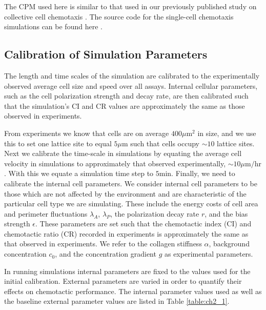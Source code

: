The CPM used here is similar to that used in our previously published study on collective cell chemotaxis \cite{varennes2016collective}. The source code for the single-cell chemotaxis simulations can be found here \cite{ch2code}.

\subsection{Calibration of Simulation Parameters}

The length and time scales of the simulation are calibrated to the experimentally observed average cell size and speed over all assays. Internal cellular parameters, such as the cell polarization strength and decay rate, are then calibrated such that the simulation's CI and CR values are approximately the same as those observed in experiments.

From experiments we know that cells are on average $400 \mu\text{m}^2$ in size, and we use this to set one lattice site to equal $5 \mu\text{m}$ such that cells occupy $\sim 10$ lattice sites. Next we calibrate the time-scale in simulations by equating the average cell velocity in simulations to approximately that observed experimentally, $\sim 10 \mu\text{m/hr}$. With this we equate a simulation time step to $5 \text{min}$. Finally, we need to calibrate the internal cell parameters. We consider internal cell parameters to be those which are not affected by the environment and are characteristic of the particular cell type we are simulating.
These include the energy costs of cell area and perimeter fluctuations $\lambda_A$, $\lambda_P$, the polarization decay rate $r$, and the bias strength $\epsilon$. These parameters are set such that the chemotactic index (CI) and chemotactic ratio (CR) recorded in experiments is approximately the same as that observed in experiments. We refer to the collagen stiffness $\alpha$, background concentration $c_0$, and the concentration gradient $g$ as experimental parameters.

In running simulations internal parameters are fixed to the values used for the initial calibration. External parameters are varied in order to quantify their effects on chemotactic performance. The internal parameter values used as well as the baseline external parameter values are listed in Table \ref{table:ch2_1}.


